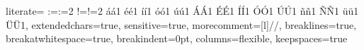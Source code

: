 {  %
  literate=%
    {:=}{{:=}}2%
    {!=}{{!=}}2%
    {á}{{\'a}}1 {é}{{\'e}}1 {í}{{\'i}}1 {ó}{{\'o}}1 {ú}{{\'u}}1%
    {Á}{{\'A}}1 {É}{{\'E}}1 {Í}{{\'I}}1 {Ó}{{\'O}}1 {Ú}{{\'U}}1%
    {ñ}{{\~n}}1 {Ñ}{{\~N}}1 {ü}{{\"u}}1 {Ü}{{\"U}}1,%
  extendedchars=true,%
  sensitive=true,%
  morecomment=[l]{//},%
  breaklines=true,%
  breakatwhitespace=true,%
  breakindent=0pt,%
  columns=flexible,%
  keepspaces=true%
}
